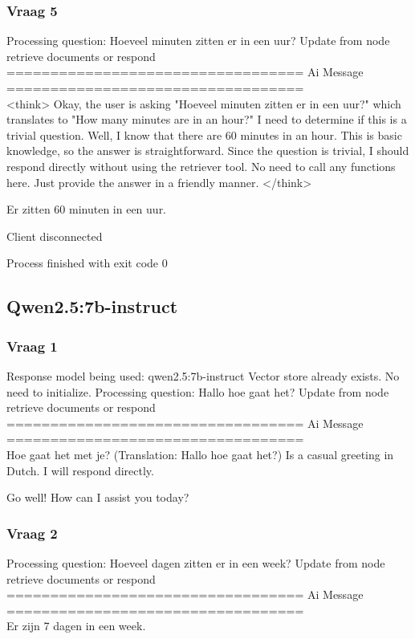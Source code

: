 \subsubsection{Vraag 5}
Processing question: Hoeveel minuten zitten er in een uur?
Update from node retrieve documents or respond
\\[1em]
================================== Ai Message ==================================
\\[1em]
<think>
Okay, the user is asking "Hoeveel minuten zitten er in een uur?" which translates to "How many minutes are in an hour?" I need to determine if this is a trivial question. Well, I know that there are 60 minutes in an hour. This is basic knowledge, so the answer is straightforward. Since the question is trivial, I should respond directly without using the retriever tool. No need to call any functions here. Just provide the answer in a friendly manner.
</think>

Er zitten 60 minuten in een uur.

Client disconnected

Process finished with exit code 0


\subsection{Qwen2.5:7b-instruct}

\subsubsection{Vraag 1}
Response model being used: qwen2.5:7b-instruct
Vector store already exists. No need to initialize.
Processing question: Hallo hoe gaat het?
Update from node retrieve  documents  or  respond
\\[1em]
================================== Ai Message ==================================
\\[1em]
Hoe gaat het met je? (Translation: Hallo hoe gaat het?) Is a casual greeting in Dutch. I will respond directly.

Go well! How can I assist you today?
\subsubsection{Vraag 2}
Processing question: Hoeveel dagen zitten er in een week?
Update from node retrieve  documents  or  respond
\\[1em]
================================== Ai Message ==================================
\\[1em]
Er zijn 7 dagen in een week.
